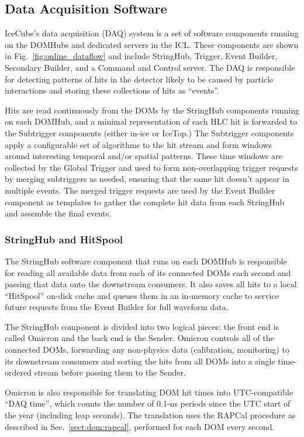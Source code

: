 \subsection{Data Acquisition Software}

IceCube's data acquisition (DAQ) system is a set of software components
running on the DOMHubs and dedicated servers in the ICL.  These components are shown in
Fig.~\ref{fig:online_dataflow} and include StringHub, Trigger, Event
Builder, Secondary Builder, and a Command and Control server.  The DAQ is
responsible for detecting patterns of hits in the detector likely to be
caused by particle interactions and storing these collections of hits as
``events''.

Hits are read continuously from the DOMs by the
StringHub components running on each DOMHub, and a minimal representation of each HLC hit is
forwarded to the Subtrigger components (either in-ice or IceTop.)
The Subtrigger components apply a
configurable set of algorithms to the hit stream and form windows around interesting temporal
and/or spatial patterns.  These time windows are collected by the
Global Trigger and used to form non-overlapping trigger requests by merging
subtriggers as needed, ensuring that the same hit doesn't appear in
multiple events.  The merged trigger requests are used by the Event Builder
component as templates 
to gather the complete hit data from each StringHub and assemble the final
events.

\subsubsection{StringHub and HitSpool}
\label{sec:domhub_hitspool}

The StringHub software component that runs on each DOMHub is responsible
for reading all available data from each of its connected DOMs each second
and passing that data onto the downstream consumers.  It also saves all
hits to a local ``HitSpool'' on-disk cache and queues them in an
in-memory cache to service future requests from the Event Builder for full
waveform data.

The StringHub component is divided into two logical pieces: the front
end is called Omicron and the back end is the Sender. Omicron controls all
of the connected DOMs, forwarding any 
non-physics data (calibration, monitoring) to its downstream consumers and
sorting the hits from all 
DOMs into a single time-ordered stream before passing them to the Sender.  

Omicron is also responsible for translating DOM hit times into
UTC-compatible ``DAQ time'', which counts the number of 0.1-ns periods
since the UTC start of the year (including leap seconds).  The translation
uses the RAPCal procedure as described in Sec.~\ref{sect:dom:rapcal},
performed for each DOM every second.  

